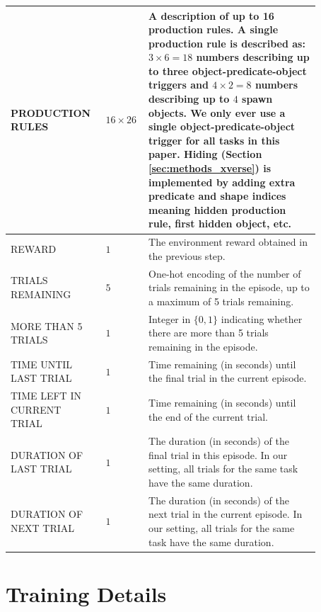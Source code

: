\documentclass[11pt, a4paper, logo, copyright]{deepmind}
\begin{document}
\begin{appendix}
\begin{longtable}{>{\raggedright}p{0.25\linewidth}|p{0.1\linewidth}|p{0.52\linewidth}}
    \hline
      PRODUCTION RULES & $16 \times 26$ & A description of up to 16 production rules. A single production rule is described as: $3 \times 6 = 18$ numbers describing up to three object-predicate-object triggers and $4 \times 2 = 8$ numbers describing up to $4$ spawn objects. We only ever use a single object-predicate-object trigger for all tasks in this paper. Hiding (Section \ref{sec:methods_xverse}) is implemented by adding extra predicate and shape indices meaning hidden production rule, first hidden object, etc. \\
      \hline
      REWARD &$1$& The environment reward obtained in the previous step.\\
      \hline
      TRIALS REMAINING &$5$& One-hot encoding of the number of trials remaining in the episode, up to a maximum of 5 trials remaining. \\
      \hline
      MORE THAN 5 TRIALS &$1$& Integer in $\{0,1\}$ indicating whether there are more than 5 trials remaining in the episode. \\
      \hline
      TIME UNTIL LAST TRIAL &$1$& Time remaining (in seconds) until the final trial in the current episode. \\
      \hline
      TIME LEFT IN CURRENT TRIAL &$1$& Time remaining (in seconds) until the end of the current trial. \\
      \hline
      DURATION OF LAST TRIAL &$1$& The duration (in seconds) of the final trial in this episode. In our setting, all trials for the same task have the same duration.  \\
      \hline
      DURATION OF NEXT TRIAL &$1$& The duration (in seconds) of the next trial in the current episode. In our setting, all trials for the same task have the same duration. \\
      \hline
\end{longtable}
\section{Training Details}
\label{app:training-details}

\end{appendix}
\end{document}
